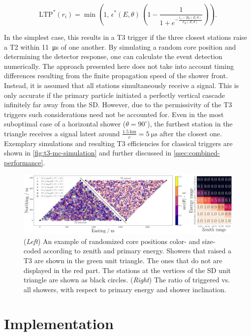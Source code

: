 \begin{equation}
	\label{eq:station-trigger-probability}
	\text{LTP}^*(r_i) = \min\left(1,\,\epsilon^*(E, \theta)\,\left(1 - \frac{1}{1+e^{-\frac{r_i-R_0(E, \theta)}{\sigma_R(E, \theta)}}}\right)\right).
\end{equation}

In the simplest case, this results in a T3 trigger if the three closest stations raise a T2 within \SI{11}{\micro\second} of one another. By simulating a random
core position and determining the detector response, one can calculate the event detection numerically. The approach presented here does not take into account 
timing differences resulting from the finite propagation speed of the shower front. Instead, it is assumed that all stations simultaneously receive a signal. This
is only accurate if the primary particle initiated a perfectly vertical cascade infinitely far away from the SD. However, due to the permissivity of the T3 
triggers such considerations need not be accounted for. Even in the most suboptimal case of a horizontal shower ($\theta = 90^\circ$), the furthest station in the 
triangle receives a signal latest around $\frac{\SI{1.5}{\kilo\meter}}{c} = \SI{5}{\micro\second}$ after the closest one. Exemplary simulations and resulting T3 
efficiencies for classical triggers are shown in \autoref{fig:t3-mc-simulation} and further discussed in \autoref{ssec:combined-performance}.

\begin{figure}
	\centering
	\includegraphics[width=1\textwidth]{./plots/t3_mc_simulation.png}
	\caption{(\textit{Left}) An example of randomized core positions color- and size-coded according to zenith and primary energy. Showers that raised a T3 are 
	shown in the green unit triangle. The ones that do not are displayed in the red part. The stations at the vertices of the SD unit triangle are shown as black
	circles. (\textit{Right}) The ratio of triggered vs. all showers, with respect to primary energy and shower inclination.}
	\label{fig:t3-mc-simulation}
\end{figure}

\section{Implementation}
\label{sec:trigger-implementation}

